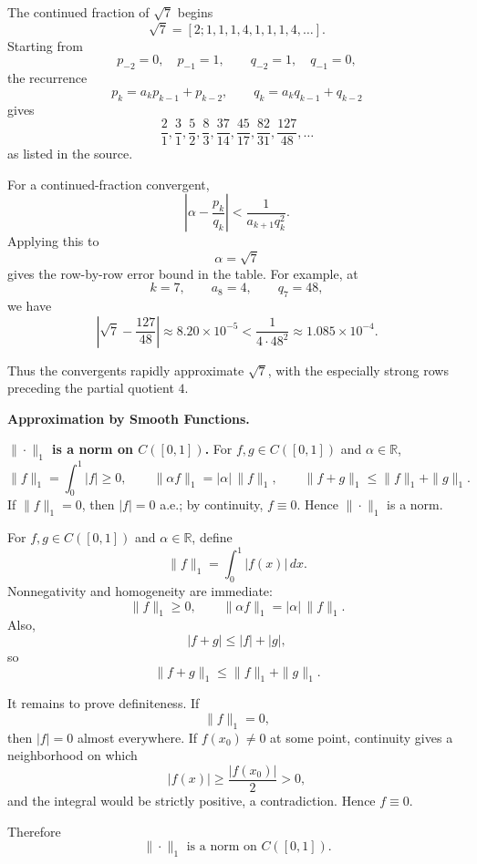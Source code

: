 \begin{solution}
The continued fraction of \(\sqrt7\) begins
\[
\sqrt7=[2;1,1,1,4,1,1,1,4,\ldots].
\]
Starting from
\[
p_{-2}=0,\quad p_{-1}=1,
\qquad
q_{-2}=1,\quad q_{-1}=0,
\]
the recurrence
\[
p_k=a_kp_{k-1}+p_{k-2},
\qquad
q_k=a_kq_{k-1}+q_{k-2}
\]
gives
\[
\frac{2}{1},
\frac31,
\frac52,
\frac83,
\frac{37}{14},
\frac{45}{17},
\frac{82}{31},
\frac{127}{48},
\ldots
\]
as listed in the source.

For a continued-fraction convergent,
\[
\left|
\alpha-\frac{p_k}{q_k}
\right|
<
\frac{1}{a_{k+1}q_k^2}.
\]
Applying this to
\[
\alpha=\sqrt7
\]
gives the row-by-row error bound in the table. For example, at
\[
k=7,
\qquad
a_8=4,
\qquad
q_7=48,
\]
we have
\[
\left|
\sqrt7-\frac{127}{48}
\right|
\approx8.20\times10^{-5}
<
\frac1{4\cdot48^2}
\approx1.085\times10^{-4}.
\]

Thus the convergents rapidly approximate \(\sqrt7\), with the especially strong rows
preceding the partial quotient \(4\).
\end{solution}


\begin{problem}[CP-II-0527]
\label{prob:cp-ii-0527}
\textbf{Approximation by Smooth Functions.}

\hspace*{1.5em}\textbf{$\|\cdot\|_{1}$ is a norm on $C([0,1])$.} For $f,g\in C([0,1])$ and $\alpha\in\mathbb{R}$,
	\[
	\|f\|_{1}=\int_{0}^{1}|f|\ge 0,\qquad
	\|\alpha f\|_{1}=|\alpha|\,\|f\|_{1},\qquad
	\|f+g\|_{1}\le \|f\|_{1}+\|g\|_{1}.
	\]
	If $\|f\|_{1}=0$, then $|f|=0$ a.e.; by continuity, $f\equiv 0$. Hence $\|\cdot\|_{1}$ is a norm.
\end{problem}

\begin{solution}
For \(f,g\in C([0,1])\) and \(\alpha\in\mathbb R\), define
\[
\|f\|_1=\int_0^1|f(x)|\,dx.
\]
Nonnegativity and homogeneity are immediate:
\[
\|f\|_1\ge0,
\qquad
\|\alpha f\|_1=|\alpha|\,\|f\|_1.
\]
Also,
\[
|f+g|\le |f|+|g|,
\]
so
\[
\|f+g\|_1\le\|f\|_1+\|g\|_1.
\]

It remains to prove definiteness. If
\[
\|f\|_1=0,
\]
then \(|f|=0\) almost everywhere. If \(f(x_0)\neq0\) at some point, continuity gives a
neighborhood on which
\[
|f(x)|\ge \frac{|f(x_0)|}{2}>0,
\]
and the integral would be strictly positive, a contradiction. Hence \(f\equiv0\).

Therefore
\[
\boxed{
\|\cdot\|_1
\text{ is a norm on }C([0,1]).
}
\]
\end{solution}


